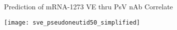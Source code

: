 \documentclass{beamer}
\begin{document}















\begin{frame}[c]{Prediction of mRNA-1273 VE thru PsV nAb Correlate}

\vspace*{-0.1cm}
\hspace*{-0.3cm}\texttt{[image: sve\_pseudoneutid50\_simplified]}

\note{
}

\end{frame}
\end{document}
